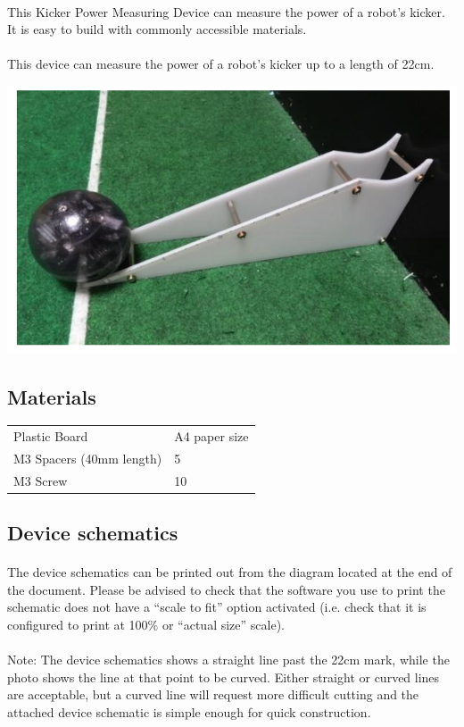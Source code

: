 \documentclass{article}
\newcommand*{\p}{\paragraph{}}
\begin{document}
\p This Kicker Power Measuring Device can measure the power of a robot's kicker.
It is easy to build with commonly accessible materials.

\p This device can measure the power of a robot's kicker up to a length of 22cm.

\includegraphics[width=1\textwidth]{media/image8.png}

\subsection{Materials}

\begin{table}
\begin{tabularx}{\textwidth}{
p{}
p{}}
Plastic Board & A4 paper size \\
M3 Spacers (40mm length) & 5 \\
M3 Screw & 10 \\

\end{tabularx}

\end{table}

\subsection{Device schematics}

\p The device schematics can be printed out from the diagram located at the end of
the document. Please be advised to check that the software you use to print the
schematic does not have a ``scale to fit'' option activated (i.e. check that it
is configured to print at 100\% or ``actual size'' scale).

\p Note: The device schematics shows a straight line past the 22cm mark, while the
photo shows the line at that point to be curved. Either straight or curved
lines are acceptable, but a curved line will request more difficult cutting and
the attached device schematic is simple enough for quick construction.
\end{document}
